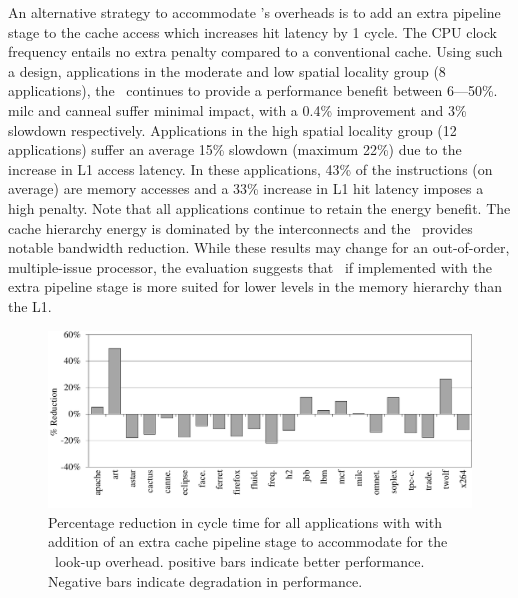 {{An alternative strategy to accommodate \AC{}'s overheads is to add an extra pipeline stage to the cache access which increases hit latency by 1 cycle. The CPU clock frequency entails no extra penalty compared to a conventional cache. Using such a design, applications in the moderate and low spatial locality group (8 applications), the \AC\ continues to provide a performance benefit between 6---50\%. milc and canneal suffer minimal impact, with a 0.4\% improvement and 3\% slowdown respectively.  Applications in the high spatial locality group (12 applications) suffer an average 15\% slowdown (maximum 22\%) due to the increase in L1 access latency. In these applications, 43\% of the instructions (on average) are memory accesses and a 33\% increase in L1 hit latency imposes a high penalty. Note that all applications continue to retain the energy benefit. The cache hierarchy energy is dominated by the interconnects and the \AC\ provides notable bandwidth reduction. While these results may change for an out-of-order, multiple-issue processor, the evaluation suggests that \AC\ if implemented with the extra pipeline stage is more suited for lower levels in the memory hierarchy than the L1.  

\begin{figure}[h]
  \centering
  \vspace{10pt}
  \includegraphics[width=\textwidth]{files/Plots/08-ExtraStage.pdf}
  \caption[Extra Cache Pipeline Stage Performance]{Percentage reduction in cycle time for all applications with with addition of an extra cache pipeline stage to accommodate for the \AC\ look-up overhead. positive bars indicate better performance. Negative bars indicate degradation in performance.}
  \label{fig:extra_cache_pipeline_stage}
\end{figure}

}}
